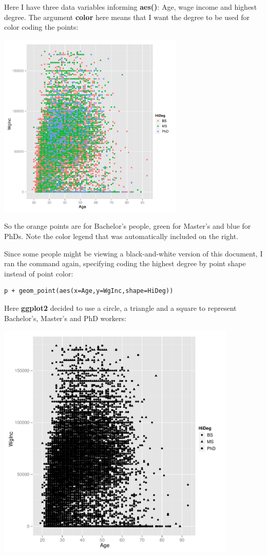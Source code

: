 Here I have three data variables informing {\bf aes()}:  Age, wage
income and highest degree.  The argument {\bf color} here means that I
want the degree to be used for color coding the points:

\includegraphics[bb=0 0 504 504,width=3.5in]{AgeIncColor.pdf}

So the orange points are for Bachelor's people, green for Master's and
blue for PhDs.  Note the color legend that was automatically included
on the right.

Since some people might be viewing a black-and-white version of this
document, I ran the command again, specifying coding the highest degree
by point shape instead of point color:

\begin{lstlisting}
p + geom_point(aes(x=Age,y=WgInc,shape=HiDeg))
\end{lstlisting}

Here {\bf ggplot2} decided to use a circle, a triangle and a square to
represent Bachelor's, Master's and PhD workers:

\includegraphics[bb=0 0 504 504,width=4.5in]{AgeIncShape.pdf}

